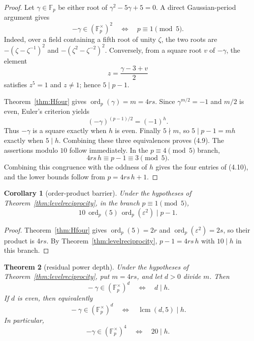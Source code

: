 \documentclass[11pt]{amsart}
\newtheorem{theorem}{Theorem}[section]
\newtheorem{corollary}[theorem]{Corollary}
\theoremstyle{definition}
\theoremstyle{remark}
\newcommand{\F}{\mathbb{F}}
\newcommand{\eps}{\varepsilon}
\newcommand{\ord}{\operatorname{ord}}
\begin{document}
\begin{proof}
Let \(\gamma\in\F_p\) be either root of
\(\gamma^2-5\gamma+5=0\).  A direct Gaussian-period argument gives
\[
 -\gamma\in(\F_p^\times)^2
 \quad\Longleftrightarrow\quad p\equiv1\pmod5.
\tag{4.11}
\]
Indeed, over a field containing a fifth root of unity \(\zeta\), the
two roots are
\(-(\zeta-\zeta^{-1})^2\) and
\(-(\zeta^2-\zeta^{-2})^2\).  Conversely, from a square root \(v\) of
\(-\gamma\), the element
\[
 z=\frac{\gamma-3+v}{2}
\]
satisfies \(z^5=1\) and \(z\ne1\); hence \(5\mid p-1\).

Theorem~\ref{thm:Hfour} gives \(\ord_p(\gamma)=m=4rs\).
Since \(\gamma^{m/2}=-1\) and \(m/2\) is even, Euler's criterion yields
\[
 (-\gamma)^{(p-1)/2}=(-1)^h.
\]
Thus \(-\gamma\) is a square exactly when \(h\) is even.  Finally
\(5\nmid m\), so \(5\mid p-1=mh\) exactly when \(5\mid h\).  Combining
these three equivalences proves (4.9).  The assertions modulo \(10\)
follow immediately.  In the \(p\equiv4\pmod5\) branch,
\[
 4rs\,h\equiv p-1\equiv3\pmod5.
\]
Combining this congruence with the oddness of \(h\) gives the four
entries of (4.10), and the lower bounds follow from \(p=4rs\,h+1\).
\end{proof}

\begin{corollary}[order-product barrier]\label{cor:orderproduct}
Under the hypotheses of Theorem~\ref{thm:levelreciprocity}, in the
branch \(p\equiv1\pmod5\),
\[
\boxed{\quad
10\,\ord_p(5)\,\ord_p(\eps^2)\mid p-1.
\quad}
\tag{4.12}
\]
\end{corollary}

\begin{proof}
Theorem~\ref{thm:Hfour} gives
\(\ord_p(5)=2r\) and \(\ord_p(\eps^2)=2s\), so their product is
\(4rs\).  By Theorem~\ref{thm:levelreciprocity},
\(p-1=4rs\,h\) with \(10\mid h\) in this branch.
\end{proof}

\begin{theorem}[residual power depth]\label{thm:powerdepth}
Under the hypotheses of Theorem~\ref{thm:levelreciprocity}, put
\(m=4rs\), and let \(d>0\) divide \(m\). Then
\[
\boxed{\quad
-\gamma\in(\F_p^\times)^d
\quad\Longleftrightarrow\quad d\mid h.
\quad}
\]
If \(d\) is even, then equivalently
\[
\boxed{\quad
-\gamma\in(\F_p^\times)^d
\quad\Longleftrightarrow\quad \operatorname{lcm}(d,5)\mid h.
\quad}
\]
In particular,
\[
-\gamma\in(\F_p^\times)^4
\quad\Longleftrightarrow\quad20\mid h.
\tag{4.13}
\]
\end{theorem}
\end{document}
